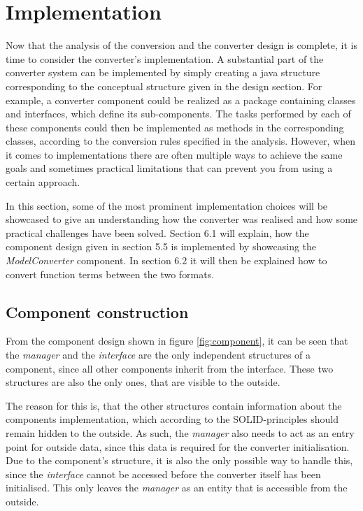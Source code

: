 \chapter{Implementation}
Now that the analysis of the conversion and the converter design is complete, it is time to consider the converter's implementation. A substantial part of the converter system can be implemented by simply creating a java structure corresponding to the conceptual structure given in the design section. For example, a converter component could be realized as a package containing classes and interfaces, which define its sub-components. The tasks performed by each of these components could then be implemented as methods in the corresponding classes, according to the conversion rules specified in the analysis. However, when it comes to implementations there are often multiple ways to achieve the same goals and sometimes practical limitations that can prevent you from using a certain approach. 

In this section, some of the most prominent implementation choices will be showcased to give an understanding how the converter was realised and how some practical challenges have been solved. Section 6.1 will explain, how the component design given in section 5.5 is implemented by showcasing the \emph{ModelConverter} component. In section 6.2 it will then be explained how to convert function terms between the two formats.

\section{Component construction}
From the component design shown in figure \ref{fig:component}, it can be seen that the \emph{manager} and the \emph{interface} are the only independent structures of a component, since all other components inherit from the interface. These two structures are also the only ones, that are visible to the outside. 

The reason for this is, that the other structures contain information about the components implementation, which according to the SOLID-principles should remain hidden to the outside.
As such, the \emph{manager} also needs to act as an entry point for outside data, since this data is required for the converter initialisation. Due to the component's structure, it is also the only possible way to handle this, since the \emph{interface} cannot be accessed before the converter itself has been initialised. This only leaves the \emph{manager} as an entity that is accessible from the outside.

